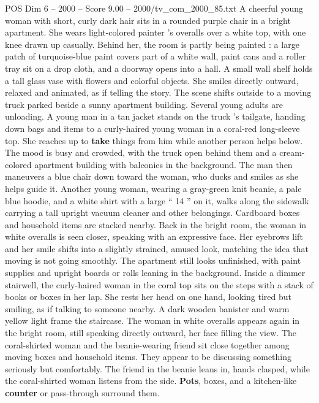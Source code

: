 \begin{textsample}{POS Dim 6 – 2000 – Score 9.00 – 2000/tv\_com\_2000\_85.txt}  \label{ex:f6_pos_053}
A cheerful young woman with short, curly dark hair sits in a rounded purple chair in a bright apartment.
She wears light-colored painter ’s overalls over a white top, with one knee drawn up casually.
Behind her, the room is partly being painted : a large patch of turquoise-blue paint covers part of a white wall, paint cans and a roller tray sit on a drop cloth, and a doorway opens into a hall.
A small wall shelf holds a tall glass vase with flowers and colorful objects.
She smiles directly outward, relaxed and animated, as if telling the story.
The scene shifts outside to a moving truck parked beside a sunny apartment building.
Several young adults are unloading.
A young man in a tan jacket stands on the truck ’s tailgate, handing down bags and items to a curly-haired young woman in a coral-red long-sleeve top.
She reaches up to \textbf{take} things from him while another person helps below.
The mood is busy and crowded, with the truck open behind them and a cream-colored apartment building with balconies in the background.
The man then maneuvers a blue chair down toward the woman, who ducks and smiles as she helps guide it.
Another young woman, wearing a gray-green knit beanie, a pale blue hoodie, and a white shirt with a large “ 14 ” on it, walks along the sidewalk carrying a tall upright vacuum cleaner and other belongings.
Cardboard boxes and household items are stacked nearby.
Back in the bright room, the woman in white overalls is seen closer, speaking with an expressive face.
Her eyebrows lift and her smile shifts into a slightly strained, amused look, matching the idea that moving is not going smoothly.
The apartment still looks unfinished, with paint supplies and upright boards or rolls leaning in the background.
Inside a dimmer stairwell, the curly-haired woman in the coral top sits on the steps with a stack of books or boxes in her lap.
She rests her head on one hand, looking tired but smiling, as if talking to someone nearby.
A dark wooden banister and warm yellow light frame the staircase.
The woman in white overalls appears again in the bright room, still speaking directly outward, her face filling the view.
The coral-shirted woman and the beanie-wearing friend sit close together among moving boxes and household items.
They appear to be discussing something seriously but comfortably.
The friend in the beanie leans in, hands clasped, while the coral-shirted woman listens from the side. \textbf{Pots}, boxes, and a kitchen-like \textbf{counter} or pass-through surround them.

\end{textsample}
